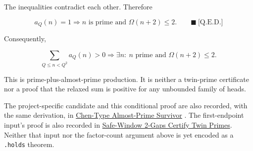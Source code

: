 The inequalities contradict each other. Therefore

\begin{equation*}
a_Q(n)=1
\Longrightarrow
n\text{ is prime and }\Omega(n+2)\le2.
\qquad\blacksquare\ \text{[Q.E.D.]}
\end{equation*}

Consequently,

\begin{equation*}
\sum_{Q\le n\lt Q^2}a_Q(n)>0
\Longrightarrow
\exists n:\ n\text{ prime and }\Omega(n+2)\le2.
\end{equation*}

This is prime-plus-almost-prime production. It is neither a twin-prime
certificate nor a proof that the relaxed sum is positive for any unbounded
family of heads.

The project-specific candidate and this conditional proof are also recorded,
with the same derivation, in
\href{https://github.com/thiagomata/prime-numbers/blob/master/candidates/chen-type-almost-prime-survivor.md}{Chen-Type Almost-Prime Survivor} \cite{chentypecandidate2026}. The first-endpoint input's
proof is also recorded in \href{https://github.com/thiagomata/prime-numbers/blob/master/properties/sieve-sequence/safe-window-two-gaps-certify-twin-primes.md}{Safe-Window 2-Gaps Certify Twin Primes}.
Neither that input nor the factor-count argument above is yet encoded as a
\texttt{.holds} theorem.
